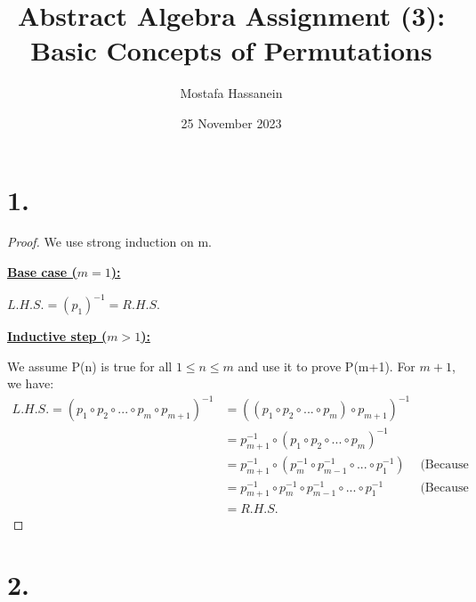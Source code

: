 \documentclass{article}
\author{Mostafa Hassanein}
\title{Abstract Algebra Assignment (3): Basic Concepts of Permutations}
\date{25 November 2023}
\begin{document}
\maketitle

\newpage

\section*{1.}

\begin{proof}
  We use strong induction on m.
  \newline

  \noindent
  \textbf{\underline{Base case ($m=1$):}} 
  
  $L.H.S. = (p_1)^{-1} = R.H.S.$
  \newline
  
  \noindent
  \textbf{\underline{Inductive step ($m>1$):}} 
  
  We assume P(n) is true for all $1 \leq n \leq m$ and use it to prove P(m+1).
  For $m+1$, we have:
  \begin{align*}
    L.H.S. = (p_1 \circ p_2 \circ ... \circ p_m \circ p_{m+1})^{-1} &= ((p_1 \circ p_2 \circ ... \circ p_m) \circ p_{m+1})^{-1} & \\
    &= p_{m+1}^{-1} \circ (p_1 \circ p_2 \circ ... \circ p_m)^{-1} & \\
    &= p_{m+1}^{-1} \circ (p_m^{-1} \circ p_{m-1}^{-1} \circ ... \circ p_1^{-1}) & \text{(Because P(2) is true)} \\
    &= p_{m+1}^{-1} \circ p_m^{-1} \circ p_{m-1}^{-1} \circ ... \circ p_1^{-1} & \text{(Because P(m) is true)} \\
    &= R.H.S.
  \end{align*}
  
\end{proof}

\section*{2.}
\end{document}

